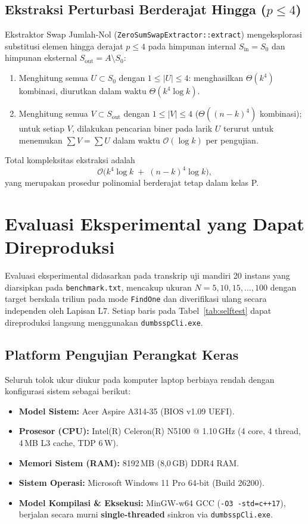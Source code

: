 \documentclass[journal,onecolumn,11pt]{IEEEtran}
\begin{document}
\subsection{Ekstraksi Perturbasi Berderajat Hingga ($p \le 4$)}
Ekstraktor Swap Jumlah-Nol (\texttt{ZeroSumSwapExtractor::extract}) mengeksplorasi substitusi elemen hingga derajat $p \le 4$ pada himpunan internal $S_{\text{in}} = S_0$ dan himpunan eksternal $S_{\text{out}} = A \setminus S_0$:
\begin{enumerate}
    \item Menghitung semua $U\subset S_0$ dengan $1\le|U|\le4$: menghasilkan $\Theta(k^4)$ kombinasi, diurutkan dalam waktu $\Theta(k^4\log k)$.
    \item Menghitung semua $V\subset S_{\text{out}}$ dengan $1\le|V|\le4$ ($\Theta((n-k)^4)$ kombinasi); untuk setiap $V$, dilakukan pencarian biner pada larik $U$ terurut untuk menemukan $\sum V = \sum U$ dalam waktu $\mathcal{O}(\log k)$ per pengujian.
\end{enumerate}
Total kompleksitas ekstraksi adalah
\begin{equation}
    \mathcal{O}\big(k^4\log k \;+\; (n-k)^4\log k\big),
\end{equation}
yang merupakan prosedur polinomial berderajat tetap dalam kelas P.

\section{Evaluasi Eksperimental yang Dapat Direproduksi}
\label{sec:experiments}

Evaluasi eksperimental didasarkan pada transkrip uji mandiri 20 instans yang diarsipkan pada \texttt{benchmark.txt}, mencakup ukuran $N=5,10,15,\dots,100$ dengan target berskala triliun pada mode \texttt{FindOne} dan diverifikasi ulang secara independen oleh Lapisan L7. Setiap baris pada Tabel~\ref{tab:selftest} dapat direproduksi langsung menggunakan \texttt{dumbsspCli.exe}.

\subsection{Platform Pengujian Perangkat Keras}
Seluruh tolok ukur diukur pada komputer laptop berbiaya rendah dengan konfigurasi sistem sebagai berikut:
\begin{itemize}
    \item \textbf{Model Sistem:} Acer Aspire A314-35 (BIOS v1.09 UEFI).
    \item \textbf{Prosesor (CPU):} Intel(R) Celeron(R) N5100 @ 1.10\,GHz (4 core, 4 thread, 4\,MB L3 cache, TDP 6\,W).
    \item \textbf{Memori Sistem (RAM):} 8192\,MB (8{,}0\,GB) DDR4 RAM.
    \item \textbf{Sistem Operasi:} Microsoft Windows 11 Pro 64-bit (Build 26200).
    \item \textbf{Model Kompilasi \& Eksekusi:} MinGW-w64 GCC (\texttt{-O3 -std=c++17}), berjalan secara murni \textbf{single-threaded} sinkron via \texttt{dumbsspCli.exe}.
\end{itemize}
\end{document}
